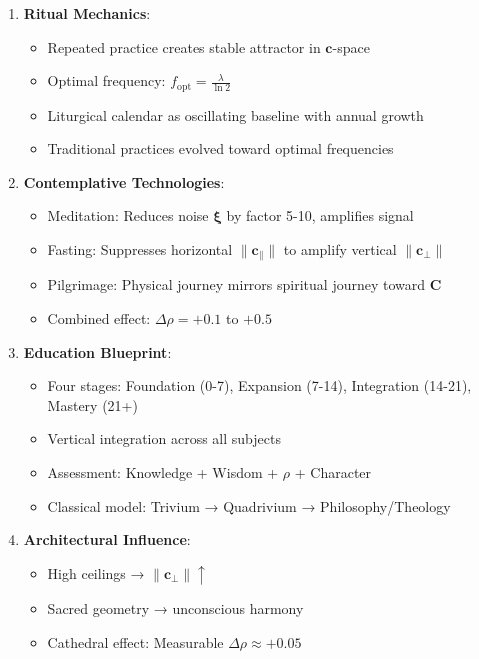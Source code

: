 \documentclass[11pt,a4paper]{article}
\theoremstyle{definition}
\theoremstyle{remark}
\newcommand{\cc}{\mathbf{c}}
\begin{document}
\begin{small}
\begin{enumerate}
\begin{protocol}
\begin{mdframed}[backgroundcolor=green!10,linewidth=2pt,linecolor=green!70!black]
\begin{enumerate}[nosep]
    \item \textbf{Ritual Mechanics}:
        \begin{itemize}[nosep]
            \item Repeated practice creates stable attractor in \(\cc\)-space
            \item Optimal frequency: \(f_{\text{opt}} = \frac{\lambda}{\ln 2}\)
            \item Liturgical calendar as oscillating baseline with annual growth
            \item Traditional practices evolved toward optimal frequencies
        \end{itemize}
    
    \item \textbf{Contemplative Technologies}:
        \begin{itemize}[nosep]
            \item Meditation: Reduces noise \(\boldsymbol{\xi}\) by factor 5-10, amplifies signal
            \item Fasting: Suppresses horizontal \(\|\cc_\parallel\|\) to amplify vertical \(\|\cc_\perp\|\)
            \item Pilgrimage: Physical journey mirrors spiritual journey toward \(\mathbf{C}\)
            \item Combined effect: \(\Delta\rho = +0.1\) to \(+0.5\)
        \end{itemize}
    
    \item \textbf{Education Blueprint}:
        \begin{itemize}[nosep]
            \item Four stages: Foundation (0-7), Expansion (7-14), Integration (14-21), Mastery (21+)
            \item Vertical integration across all subjects
            \item Assessment: Knowledge + Wisdom + \(\rho\) + Character
            \item Classical model: Trivium → Quadrivium → Philosophy/Theology
        \end{itemize}
    
    \item \textbf{Architectural Influence}:
        \begin{itemize}[nosep]
            \item High ceilings → \(\|\cc_\perp\| \uparrow\)
            \item Sacred geometry → unconscious harmony
            \item Cathedral effect: Measurable \(\Delta\rho \approx +0.05\)
        \end{itemize}
\end{enumerate}


\end{mdframed}
\end{protocol}
\end{enumerate}
\end{small}
\end{document}
